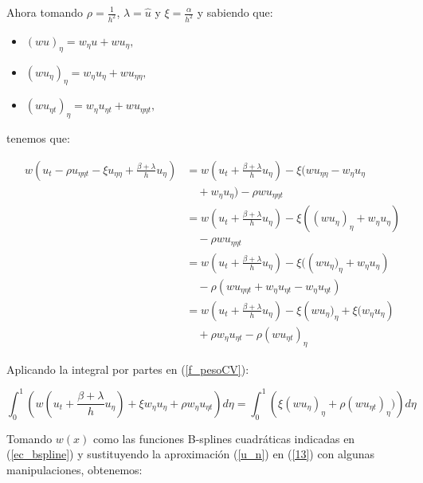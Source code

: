 Ahora tomando $\rho=\frac{1}{h^{2}}$, $\lambda=\widehat{u}$ y $\xi=\frac{\alpha}{h^{2}}$ y sabiendo que:

\begin{itemize}
    \item $(wu)_{\eta}=w_{\eta}u+wu_{\eta},$
    \item $(wu_{\eta})_{\eta}=w_{\eta}u_{\eta}+wu_{\eta \eta},$
    \item $(wu_{\eta t})_{\eta}=w_{\eta}u_{\eta t}+wu_{\eta \eta t},$
\end{itemize}

tenemos que:

\begin{equation}
\label{ecuacionpartes}
\begin{split}
    \quad w\left(u_{t}-\rho u_{\eta \eta t}-\xi u_{\eta \eta}+\frac{\beta+ \lambda}{h}u_{\eta}\right) & =w\left(u_{t}+\frac{\beta+ \lambda}{h}u_{\eta}\right)-\xi\big(wu_{\eta \eta}-w_{\eta}u_{\eta}\\
    & \quad +w_{\eta}u_{\eta}\big)-\rho wu_{\eta \eta t } \\
    & =
    w\left(u_{t}+\frac{\beta+ \lambda}{h}u_{\eta}\right)-\xi\left((wu_{\eta})_{\eta}+ w_{\eta}u_{\eta}\right)\\
    & \quad -\rho wu_{\eta \eta t }\\ 
    & = w\left(u_{t}+\frac{\beta+ \lambda}{h}u_{\eta}\right)-\xi(\left(wu_{\eta})_{\eta}+ w_{\eta}u_{\eta}\right)\\
    & \quad -\rho( wu_{\eta \eta t } +w_{\eta}u_{\eta t}-w_{\eta}u_{\eta t})\\
    & = w\left(u_{t}+\frac{\beta+\lambda}{h}u_{\eta}\right)-\xi\left(wu_{\eta})_{\eta}+\xi(w_{\eta}u_{\eta}\right)\\
    & \quad +\rho w_{\eta}u_{\eta t} -\rho \left(wu_{\eta t}\right)_{\eta}
\end{split}
\end{equation}


Aplicando la integral por partes en (\ref{f_pesoCV}):

\begin{equation}
\label{13}
    \displaystyle\int_{0}^{1}\left(w(u_{t}+\frac{\beta + \lambda}{h}u_{\eta})+\xi w_{\eta}u_{\eta}+\rho w_{\eta}u_{\eta t} \right) d\eta=\displaystyle\int_{0}^{1}\left(\xi (wu_{\eta})_{\eta}+\rho (wu_{\eta t})_{\eta})\right) d\eta
\end{equation}

Tomando $w(x)$ como las funciones B-splines cuadráticas indicadas en (\ref{ec_bspline}) y sustituyendo la aproximación (\ref{u_n}) en (\ref{13}) con algunas manipulaciones, obtenemos:

